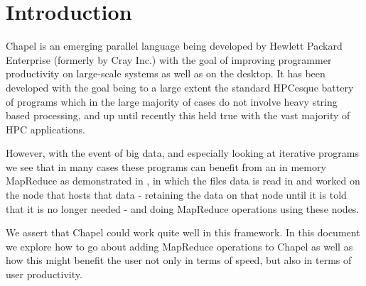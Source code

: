 
\section{Introduction}\label{s:intro}
Chapel is an emerging parallel language being developed by Hewlett Packard
Enterprise (formerly by Cray Inc.) with
the goal of improving programmer productivity on large-scale systems as
well as on the desktop. It has been developed with the goal being to a
large extent the  standard HPCesque battery of programs which in the large
majority of cases do not involve heavy string based processing, and up
until recently this held true with the vast majority of HPC applications.

However, with the event of big data, and especially looking at iterative
programs we see that in many cases these programs can
benefit from an in memory MapReduce as demonstrated in \cite{zaharia2010spark},
in which the files data is read in and worked on the node that hosts that data 
- retaining the data on that node until it is told that it is no longer needed - 
and doing MapReduce operations using these nodes.

We assert that Chapel could work quite well in this framework. In this
document we explore how to go about adding MapReduce operations to Chapel as 
well as how this might benefit the user not only in terms of speed, but also 
in terms of user productivity.

%
